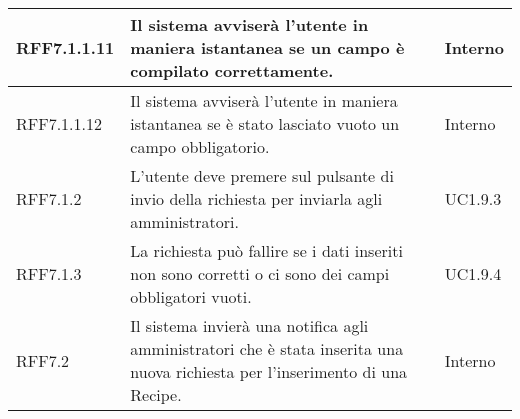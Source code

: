 \begin{center}
\begin{longtable}{| p{2.5cm} | p{8cm} | p{2cm} |}
		\hline
		RFF7.1.1.11 & Il sistema avviserà l'utente in maniera istantanea se un campo è compilato correttamente. & Interno \\
		\hline
		RFF7.1.1.12 & Il sistema avviserà l'utente in maniera istantanea se è stato lasciato vuoto un campo obbligatorio. & Interno \\
		\hline
		RFF7.1.2 & L'utente deve premere sul pulsante di invio della richiesta per inviarla agli amministratori. & UC1.9.3  \\
		\hline
		RFF7.1.3 & La richiesta può fallire se i dati inseriti non sono corretti o ci sono dei campi obbligatori vuoti. & UC1.9.4  \\
		\hline
		RFF7.2  & Il sistema invierà una notifica agli amministratori che è stata inserita una nuova richiesta per l'inserimento di una Recipe. & Interno \\
		\hline



\end{longtable}
\end{center}
